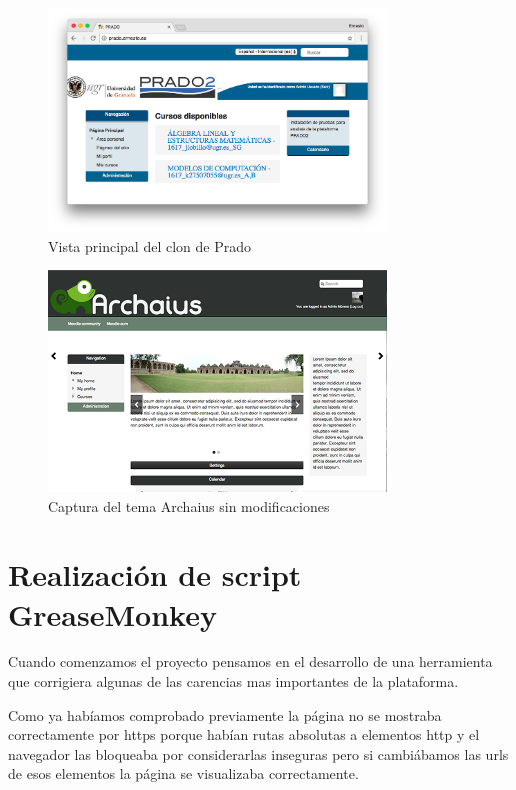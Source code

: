 \begin{figure}[H]
\centering
\includegraphics[width=0.8\textwidth]{../screenshots/pradoernesto}
\caption{Vista principal del clon de Prado}
\label{fig:pradoernesto}
\end{figure}

\begin{figure}[H]
\centering
\includegraphics[width=0.8\textwidth]{../screenshots/archaius}
\caption{Captura del tema Archaius sin modificaciones}
\label{fig:archaius}
\end{figure}




\section{Realización de script GreaseMonkey}

Cuando comenzamos el proyecto pensamos en el desarrollo de una herramienta que corrigiera algunas de las carencias mas importantes de la plataforma.

\bigskip
Como ya habíamos comprobado previamente la página no se mostraba correctamente por https porque habían rutas absolutas a elementos http y el navegador las bloqueaba por considerarlas inseguras pero si cambiábamos las urls de esos elementos la página se visualizaba correctamente.

